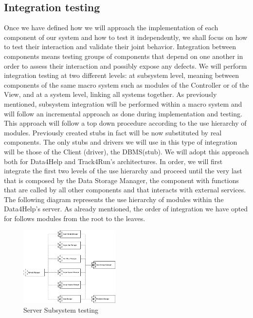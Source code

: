 \documentclass[titlepage]{article}
\begin{document}
\subsection{Integration testing}
Once we have defined how we will approach the implementation of each component of our system and how to test it independently, we shall focus on how to test their interaction and validate their joint behavior. Integration between components means testing groups of components that depend on one another in order to assess their interaction and possibly expose any defects. We will perform integration testing at two different levels: at subsystem level, meaning between components of the same macro system such as modules of the Controller or of the View, and at a system level, linking all systems together.
\newline
\newline
As previously mentioned, subsystem integration will be performed within a macro system and will follow an incremental approach as done during implementation and testing. This approach will follow a top down procedure according to the use hierarchy of modules. Previously created stubs in fact will be now substituted by real components. The only stubs and drivers we will use in this type of integration will be those of the Client (driver), the DBMS(stub). We will adopt this approach both for Data4Help and Track4Run’s architectures. In order, we will first integrate the first two levels of the use hierarchy and proceed until the very last that is composed by the Data Storage Manager, the component with functions that are called by all other components and that interacts with external services. 
\newline
\newline
The following diagram represents the use hierarchy of modules within the Data4Help’s server. As already mentioned, the order of integration we have opted for follows modules from the root to the leaves.
\begin{figure}[H]
	\center
  	\includegraphics[width=5cm]{serverSubsystemTesting.png}
  	\caption{Server Subsystem testing}
 	\label{fig:serverSubsystemTesting}
\end{figure}
\end{document}
